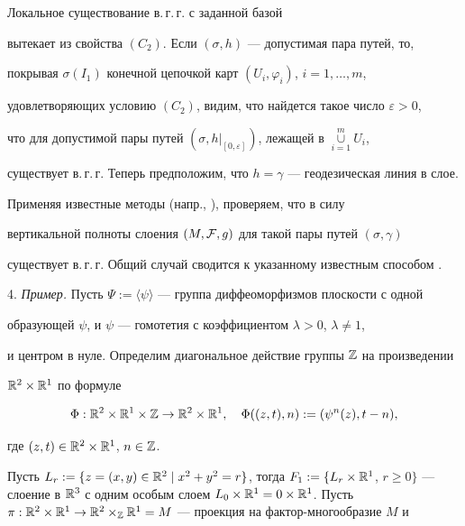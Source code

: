 \begin{pf}


Локальное существование в.\,г.\,г. с заданной базой


вытекает из свойства $(C_2)$. Если $(\sigma,h)$ --- допустимая пара путей, то,


покрывая $\sigma(I_1)$ конечной цепочкой карт $(U_i,\varphi_i)$, $i=1,\dotsc, m$,


удовлетворяющих условию $(C_2)$, видим, что найдется такое число $\varepsilon>0$,


что для допустимой пары путей $(\sigma,h|_{[0,\varepsilon]})$, лежащей в $\mathop{\cup}\limits_{i=1}^mU_i$,


существует в.\,г.\,г. Теперь предположим, что $h=\gamma$ --- геодезическая линия в слое.


Применяя известные методы (напр., \cite{Z5}), проверяем, что в силу


вертикальной полноты слоения  $(M,{\cal F},g)$ для такой пары путей $(\sigma,\gamma)$


существует в.\,г.\,г. Общий случай сводится к указанному известным способом \cite{Z5}.


\end{pf}





4. {\it Пример.} Пусть $\Psi:=\langle\psi\rangle$ --- группа диффеоморфизмов плоскости с одной


образующей $\psi$, и $\psi$ --- гомотетия с коэффициентом $\lambda>0$, $\lambda\neq 1$,


и центром в нуле. Определим диагональное действие группы $\Bbb Z$ на произведении


${\Bbb R}^2\times {\Bbb R}^1$ по формуле


$$


\Phi: {\Bbb R}^2\times {\Bbb R}^1\times {\Bbb Z}\to {\Bbb R}^2\times {\Bbb


R}^1,\quad


\Phi((z,t),n):=(\psi^n(z),t-n),


$$


где $(z,t)\in{\Bbb R}^2\times {\Bbb R}^1$, $n\in\Bbb Z$.


Пусть $L_r:=\{z=(x,y)\in{\Bbb R}^2\mid x^2+y^2=r\}$, тогда $F_1:=\{L_r\times{\Bbb R}^1$, $r\ge


0\}$ --- слоение в ${\Bbb R}^3$ с одним особым слоем $L_0\times{\Bbb R}^1=0\times{\Bbb


R}^1$. Пусть $\pi: {\Bbb R}^2\times {\Bbb R}^1\to {\Bbb R}^2\times_{\Bbb Z} {\Bbb


R}^1=M$ --- проекция на фактор-многообразие $M$ и


